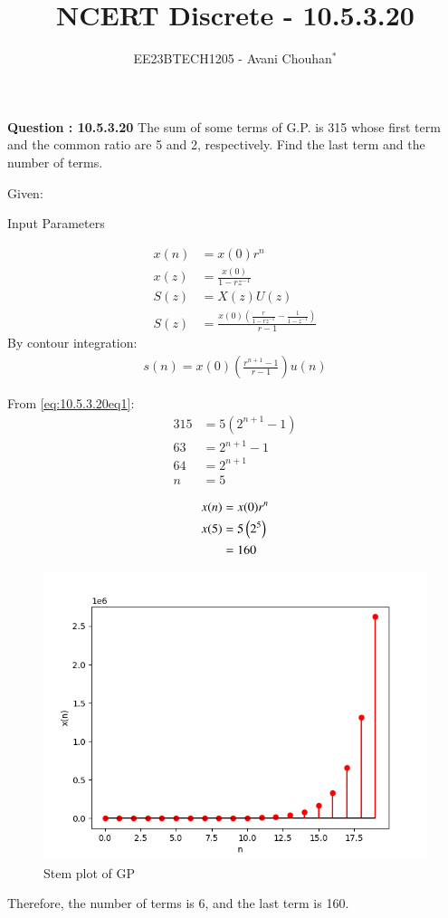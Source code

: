 \documentclass[journal,12pt,twocolumn]{IEEEtran}
\theoremstyle{remark}
\begin{document}

\vspace{3cm}

\title{NCERT Discrete - 10.5.3.20}
\author{EE23BTECH1205 - Avani Chouhan$^{*}$%
}
\maketitle
\newpage
\bigskip

\renewcommand{\thefigure}{\theenumi}
\renewcommand{\thetable}{\theenumi}

\vspace{3cm}
\textbf{Question : 10.5.3.20} 
The sum of some terms of G.P. is 315 whose first term and the common ratio are 5 and 2, respectively. Find the last term and the number of terms.\\
\solution

Given:
\begin{table}
  \centering
  
  
  \caption{Input Parameters}
  \label{tab:10.5.3.20table1}
\end{table}
\begin{align}
x(n) &= x(0)r^n\\
x(z) &= \frac{x(0)}{1-rz^{-1}}\\
S(z) &= X(z)U(z)\\
S(z) &= \frac{x(0)(\frac{r}{1-rz^{-1}}-\frac{1}{1-z^{-1}})}{r-1}
\end{align}
By contour integration:
\begin{align}
s(n) = x(0)\left(\frac{r^{n+1}-1}{r-1}\right)u(n)
\label{eq:10.5.3.20eq1}
\end{align}

From \eqref{eq:10.5.3.20eq1}:
\begin{align}
315 &= 5(2^{n+1}- 1)  \\
63 &= 2^{n+1}-1  \\
64 &= 2^{n+1} \\
n &= 5
\end{align}

\begin{align}
x(n) &= x(0)r^{n}\\
x(5) &= 5\left(2^{5}\right)\\
 &= 160 
\end{align}

\begin{figure}
    \centering
    \includegraphics[width=0.8\columnwidth]{figs/graph.png}
    \caption{Stem plot of GP}
    \label{fig:10.5.3.20fig1}
\end{figure}

Therefore, the number of terms is 6, and the last term is 160.
\end{document}

